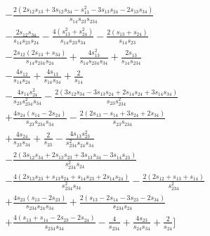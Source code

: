 \begin{align}
&-\frac{2\left(
2s_{12}s_{13}+3s_{12}s_{34}
-s_{13}^{2}-3s_{13}s_{24}
-2s_{13}s_{34}
\right)}
{s_{14}s_{23}s_{234}}
 \nonumber \\
&-\frac{2s_{12}s_{34}}
{s_{14}s_{23}s_{24}}
-\frac{4(s_{13}^{2}+s_{24}^{2})}
{s_{14}s_{23}s_{34}}
-\frac{2(s_{13}+s_{24})}
{s_{14}s_{23}}
 \nonumber \\
&-\frac{2s_{12}(2s_{13}+s_{34})}
{s_{14}s_{234}s_{24}}
+\frac{4s_{13}^{2}}
{s_{14}s_{234}s_{34}}
+\frac{2s_{13}}{s_{14}s_{234}}
 \nonumber \\
&-\frac{4s_{12}}{s_{14}s_{24}}
+\frac{4s_{13}}{s_{14}s_{34}}
+\frac{2}{s_{14}}
 \nonumber \\[1mm]
&-\frac{4s_{14}s_{24}^{2}}
{s_{23}s_{234}^{2}s_{34}}
-\frac{2\left(
3s_{12}s_{34}-3s_{13}s_{24}
+2s_{14}s_{24}+3s_{14}s_{34}
\right)}
{s_{23}s_{234}^{2}}
 \nonumber \\
&+\frac{4s_{24}(s_{14}-2s_{24})}
{s_{23}s_{234}s_{34}}
-\frac{2(2s_{13}-s_{14}+3s_{24}+2s_{34})}
{s_{23}s_{234}}
 \nonumber \\
&+\frac{4s_{24}}{s_{23}s_{34}}
+\frac{2}{s_{23}}
-\frac{4s_{13}s_{23}^{2}}
{s_{234}^{2}s_{24}s_{34}}
 \nonumber \\
&-\frac{2\left(
3s_{12}s_{34}+2s_{13}s_{23}
+3s_{13}s_{34}-3s_{14}s_{23}
\right)}
{s_{234}^{2}s_{24}}
 \nonumber \\
&-\frac{4\left(
2s_{13}s_{23}+s_{13}s_{24}
+s_{14}s_{23}+2s_{14}s_{24}
\right)}
{s_{234}^{2}s_{34}}
-\frac{2(2s_{12}+s_{13}+s_{14})}
{s_{234}^{2}}
 \nonumber \\
&+\frac{4s_{23}(s_{13}-2s_{23})}
{s_{234}s_{24}s_{34}}
+\frac{2(s_{13}-2s_{14}-3s_{23}-2s_{34})}
{s_{234}s_{24}}
 \nonumber \\
&+\frac{4(s_{13}+s_{14}-2s_{23}-2s_{24})}
{s_{234}s_{34}}
-\frac{4}{s_{234}}
+\frac{4s_{23}}{s_{24}s_{34}}
+\frac{2}{s_{24}}\Bigg]
\end{align}
